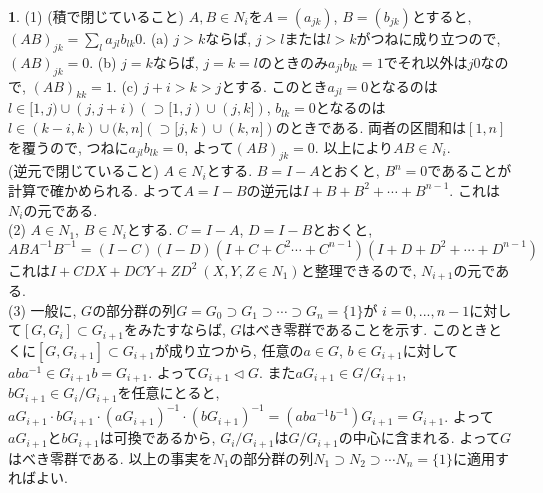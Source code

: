 \documentclass{amsart}
\theoremstyle{definition}
\newtheorem{ans}{}
\numberwithin{ans}{subsection}
\begin{document}
\begin{ans}
  (1) (積で閉じていること) $A, B \in N_i$を$A = (a_{jk})$, $B = (b_{jk})$とすると,
  $(AB)_{jk} = \sum_l a_{jl}b_{lk}0$.
  (a) $j > k$ならば, $j > l$または$l > k$がつねに成り立つので, $(AB)_{jk} = 0$.
  (b) $j = k$ならば, $j = k = l$のときのみ$a_{jl}b_{lk} = 1$でそれ以外は$j$$0$なので, $(AB)_{kk} = 1$.
  (c) $j + i > k > j$とする. このとき$a_{jl} = 0$となるのは$l \in [1, j) \cup (j, j + i) (\supset [1, j) \cup (j, k])$,
  $b_{lk} = 0$となるのは$l \in (k - i, k) \cup (k, n] (\supset [j, k) \cup (k, n])$のときである.
  両者の区間和は$[1, n]$を覆うので, つねに$a_{jl}b_{lk} = 0$, よって$(AB)_{jk} = 0$.
  以上により$AB \in N_i$.\\
  (逆元で閉じていること) $A \in N_i$とする. $B = I - A$とおくと,
  $B^{n} = 0$であることが計算で確かめられる.
  よって$A = I - B$の逆元は$I + B + B^2 + \cdots + B^{n-1}$.
  これは$N_i$の元である.\\
  (2) $A \in N_1$, $B \in N_i$とする.
  $C = I - A$, $D = I - B$とおくと,
  \[
    ABA^{-1}B^{-1} = (I - C)(I - D)(I + C + C^2 \cdots + C^{n-1})(I + D + D^2 + \cdots + D^{n-1})
  \]
  これは$I + CDX + DCY + ZD^2\ (X, Y, Z \in N_1)$と整理できるので, $N_{i+1}$の元である.\\
  (3) 一般に, $G$の部分群の列$G = G_0 \supset G_1 \supset \cdots \supset G_n = \{1\}$が
  $i = 0,..., n - 1$に対して$[G, G_i] \subset G_{i+1}$をみたすならば, $G$はべき零群であることを示す.
  このときとくに$[G, G_{i+1}] \subset G_{i+1}$が成り立つから,
  任意の$a \in G$, $b \in G_{i+1}$に対して$aba^{-1} \in G_{i+1}b = G_{i+1}$.
  よって$G_{i+1} \triangleleft G$.
  また$aG_{i+1} \in G/G_{i+1}$, $bG_{i+1} \in G_i/G_{i+1}$を任意にとると,
  $aG_{i+1} \cdot bG_{i+1} \cdot (aG_{i+1})^{-1} \cdot (bG_{i+1})^{-1} = (aba^{-1}b^{-1})G_{i+1} = G_{i+1}$.
  よって$aG_{i+1}$と$bG_{i+1}$は可換であるから, $G_i/G_{i+1}$は$G/G_{i+1}$の中心に含まれる.
  よって$G$はべき零群である. 以上の事実を$N_1$の部分群の列$N_1 \supset N_2 \supset \cdots N_{n} = \{1\}$に適用すればよい.
\end{ans}
\end{document}
